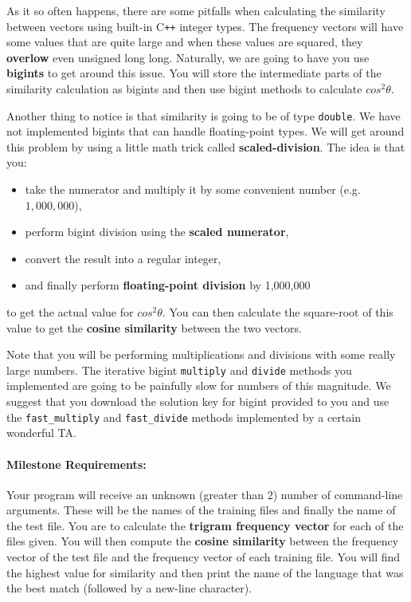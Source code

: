 \documentclass[]{article}
\providecommand{\tightlist}{%
  \setlength{\itemsep}{0pt}\setlength{\parskip}{0pt}}
\let\oldparagraph\paragraph
\renewcommand{\paragraph}[1]{\oldparagraph{#1}\mbox{}}
\begin{document}
As it so often happens, there are some pitfalls when calculating the
similarity between vectors using built-in C\texttt{++} integer types. The
frequency vectors will have some values that are quite large and when
these values are squared, they \textbf{overlow} even unsigned long long.
Naturally, we are going to have you use \textbf{bigints} to get around
this issue. You will store the intermediate parts of the similarity
calculation as bigints and then use bigint methods to calculate
\(cos^2 \theta\).

Another thing to notice is that similarity is going to be of type
\texttt{double}. We have not implemented bigints that can handle
floating-point types. We will get around this problem by using a little
math trick called \textbf{scaled-division}. The idea is that you: 

\begin{itemize}
\tightlist
\item
  take the numerator and multiply it by some convenient number (e.g. \(1,000,000\)),
\item
  perform bigint division using the \textbf{scaled numerator},
\item
  convert the result into a regular integer,
\item
  and finally perform \textbf{floating-point division} by 1,000,000
\end{itemize}

to get the actual value for \(cos^2 \theta\). You can then calculate the
square-root of this value to get the \textbf{cosine similarity} between
the two vectors.

Note that you will be performing multiplications and divisions with some
really large numbers. The iterative bigint \texttt{multiply} and
\texttt{divide} methods you implemented are going to be painfully slow
for numbers of this magnitude. We suggest that you download the solution
key for bigint provided to you and use the \texttt{fast\_multiply} and
\texttt{fast\_divide} methods implemented by a certain wonderful TA.

\paragraph{Milestone Requirements:}\label{milestone-requirements-1}

Your program will receive an unknown (greater than 2) number of
command-line arguments. These will be the names of the training files
and finally the name of the test file. You are to calculate the
\textbf{trigram frequency vector} for each of the files given. You will
then compute the \textbf{cosine similarity} between the frequency vector
of the test file and the frequency vector of each training file. You
will find the highest value for similarity and then print the name of
the language that was the best match (followed by a new-line character).
\end{document}
